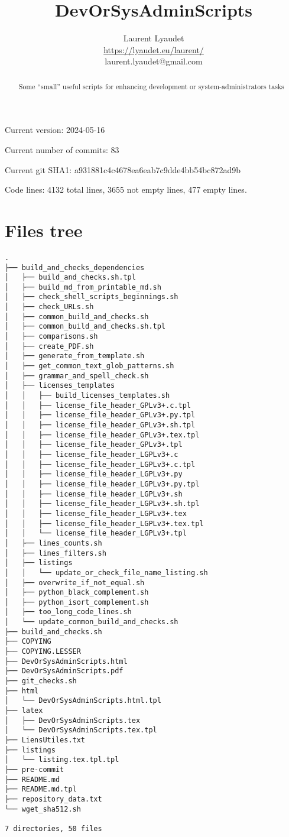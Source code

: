 \documentclass{article}
\begin{document}
\author{
  Laurent Lyaudet\\
  \url{https://lyaudet.eu/laurent/}\\
  laurent.lyaudet@gmail.com
}
\title{DevOrSysAdminScripts}

\maketitle
\begin{abstract}
Some ``small'' useful scripts
for enhancing development or system-administrators tasks
\end{abstract}

Current version: 2024-05-16

Current number of commits: 83

Current git SHA1: a931881c4c4678ea6eab7c9dde4bb54bc872ad9b

Code lines: 4132 total lines, 3655 not empty lines, 477 empty lines.

\section{Files tree}
\label{section:tree}

\begin{verbatim}
.
├── build_and_checks_dependencies
│   ├── build_and_checks.sh.tpl
│   ├── build_md_from_printable_md.sh
│   ├── check_shell_scripts_beginnings.sh
│   ├── check_URLs.sh
│   ├── common_build_and_checks.sh
│   ├── common_build_and_checks.sh.tpl
│   ├── comparisons.sh
│   ├── create_PDF.sh
│   ├── generate_from_template.sh
│   ├── get_common_text_glob_patterns.sh
│   ├── grammar_and_spell_check.sh
│   ├── licenses_templates
│   │   ├── build_licenses_templates.sh
│   │   ├── license_file_header_GPLv3+.c.tpl
│   │   ├── license_file_header_GPLv3+.py.tpl
│   │   ├── license_file_header_GPLv3+.sh.tpl
│   │   ├── license_file_header_GPLv3+.tex.tpl
│   │   ├── license_file_header_GPLv3+.tpl
│   │   ├── license_file_header_LGPLv3+.c
│   │   ├── license_file_header_LGPLv3+.c.tpl
│   │   ├── license_file_header_LGPLv3+.py
│   │   ├── license_file_header_LGPLv3+.py.tpl
│   │   ├── license_file_header_LGPLv3+.sh
│   │   ├── license_file_header_LGPLv3+.sh.tpl
│   │   ├── license_file_header_LGPLv3+.tex
│   │   ├── license_file_header_LGPLv3+.tex.tpl
│   │   └── license_file_header_LGPLv3+.tpl
│   ├── lines_counts.sh
│   ├── lines_filters.sh
│   ├── listings
│   │   └── update_or_check_file_name_listing.sh
│   ├── overwrite_if_not_equal.sh
│   ├── python_black_complement.sh
│   ├── python_isort_complement.sh
│   ├── too_long_code_lines.sh
│   └── update_common_build_and_checks.sh
├── build_and_checks.sh
├── COPYING
├── COPYING.LESSER
├── DevOrSysAdminScripts.html
├── DevOrSysAdminScripts.pdf
├── git_checks.sh
├── html
│   └── DevOrSysAdminScripts.html.tpl
├── latex
│   ├── DevOrSysAdminScripts.tex
│   └── DevOrSysAdminScripts.tex.tpl
├── LiensUtiles.txt
├── listings
│   └── listing.tex.tpl.tpl
├── pre-commit
├── README.md
├── README.md.tpl
├── repository_data.txt
└── wget_sha512.sh

7 directories, 50 files
\end{verbatim}
\end{document}
